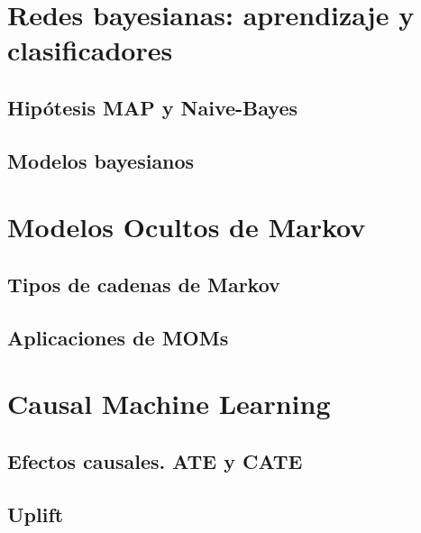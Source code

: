 \documentclass[
  a4paper,
  DIV=11,
  numbers=noendperiod]{scrreprt}
\begin{document}
\hypertarget{redes-bayesianas-aprendizaje-y-clasificadores}{%
\section{Redes bayesianas: aprendizaje y
clasificadores}\label{redes-bayesianas-aprendizaje-y-clasificadores}}

\hypertarget{hipuxf3tesis-map-y-naive-bayes}{%
\subsection{Hipótesis MAP y
Naive-Bayes}\label{hipuxf3tesis-map-y-naive-bayes}}

\hypertarget{modelos-bayesianos}{%
\subsection{Modelos bayesianos}\label{modelos-bayesianos}}

\hypertarget{modelos-ocultos-de-markov}{%
\section{Modelos Ocultos de Markov}\label{modelos-ocultos-de-markov}}

\hypertarget{tipos-de-cadenas-de-markov}{%
\subsection{Tipos de cadenas de
Markov}\label{tipos-de-cadenas-de-markov}}

\hypertarget{aplicaciones-de-moms}{%
\subsection{Aplicaciones de MOMs}\label{aplicaciones-de-moms}}

\hypertarget{causal-machine-learning}{%
\section{Causal Machine Learning}\label{causal-machine-learning}}

\hypertarget{efectos-causales.-ate-y-cate}{%
\subsection{Efectos causales. ATE y
CATE}\label{efectos-causales.-ate-y-cate}}

\hypertarget{uplift}{%
\subsection{Uplift}\label{uplift}}
\end{document}
